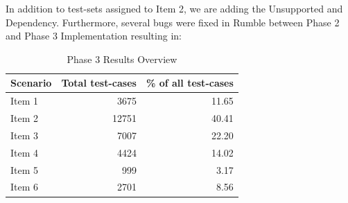 In addition to test-sets assigned to Item 2, we are adding the Unsupported and Dependency. Furthermore, several bugs were fixed in Rumble between Phase 2 and Phase 3 Implementation resulting in:
\begin{table}[h!]
	\centering
	\begin{tabular}{|l|r|r|}
		\hline
		\multicolumn{1}{|c|}{Scenario} & \multicolumn{1}{c|}{Total test-cases} & \multicolumn{1}{c|}{\% of all test-cases} \\ \hline
		Item 1                         & 3675                                  & 11.65                                     \\ \hline
		Item 2                         & 12751                                 & 40.41                                     \\ \hline
		Item 3                         & 7007                                  & 22.20                                     \\ \hline
		Item 4                         & 4424                                  & 14.02                                     \\ \hline
		Item 5                         & 999                                   & 3.17                                      \\ \hline
		Item 6                         & 2701                                  & 8.56                                      \\ \hline
	\end{tabular}
	\caption{Phase 3 Results Overview}
	\label{tab:Phase3_ResultTable}
\end{table}


